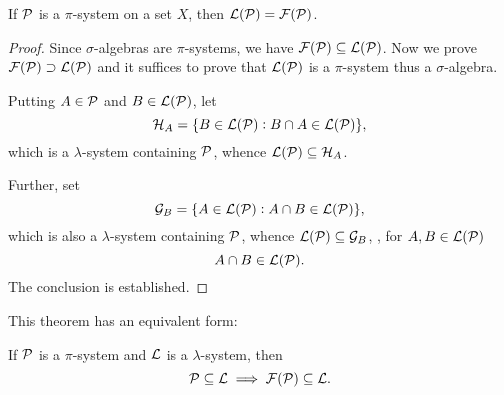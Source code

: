 \begin{thm}
If $\mathcal{P}$ is a $\pi$-system on a set $X$, then $\mathcal{L}(\mathcal{P}) = \mathcal{F}(\mathcal{P})$. 
\end{thm}
\begin{proof}
Since $\sigma$-algebras are $\pi$-systems, we have $\mathcal{F}(\mathcal{P}) \subseteq 
\mathcal{L}(\mathcal{P})$. 
Now we prove $\mathcal{F}(\mathcal{P}) \supset \mathcal{L}(\mathcal{P})$ and it suffices to prove that 
$\mathcal{L}(\mathcal{P})$ is a $\pi$-system thus a $\sigma$-algebra. 

Putting $A \in \mathcal{P}$ and $B \in \mathcal{L}(\mathcal{P})$, let 
\begin{equation*}
    \mathcal{H}_A = \{B \in \mathcal{L}(\mathcal{P}): B \cap A \in \mathcal{L}(\mathcal{P})\}, 
\end{equation*}
which is a $\lambda$-system containing $\mathcal{P}$, whence $\mathcal{L}(\mathcal{P}) \subseteq 
\mathcal{H}_A$. 

Further, set 
\begin{equation*}
    \mathcal{G}_B = \{A \in \mathcal{L}(\mathcal{P}): A \cap B \in \mathcal{L}(\mathcal{P})\}, 
\end{equation*}
which is also a $\lambda$-system containing $\mathcal{P}$, whence $\mathcal{L}(\mathcal{P}) \subseteq 
\mathcal{G}_B$, \ie, for $A, B \in \mathcal{L}(\mathcal{P})$ 
\begin{equation*}
    A \cap B \in \mathcal{L}(\mathcal{P}). 
\end{equation*}
The conclusion is established. 
\end{proof}

This theorem has an equivalent form: 
\begin{cor}
If $\mathcal{P}$ is a $\pi$-system and $\mathcal{L}$ is a $\lambda$-system, then 
\begin{equation*}
    \mathcal{P} \subseteq \mathcal{L} \implies \mathcal{F}(\mathcal{P}) \subseteq \mathcal{L}. 
\end{equation*}
\end{cor}
